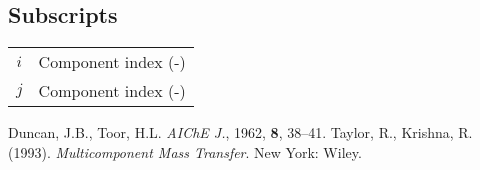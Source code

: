 \documentclass[twocolumn]{article}
\begin{document}
\subsection*{Subscripts}
\begin{table}[H]
    \begin{tabular}{c l} 
      $i$ & Component index (-)\\
      $j$ & Component index (-) \\
    \end{tabular}
\end{table}

\begin{thebibliography}{5}
\label{eqn:my_ref_2}
Duncan, J.B., Toor, H.L. \textit{AIChE J.}, 1962, \textbf{8}, 38–41.
\label{eqn:my_ref_1}
Taylor, R., Krishna, R. (1993). \textit{Multicomponent Mass Transfer}. New York: Wiley.
\end{thebibliography}
\end{document}
